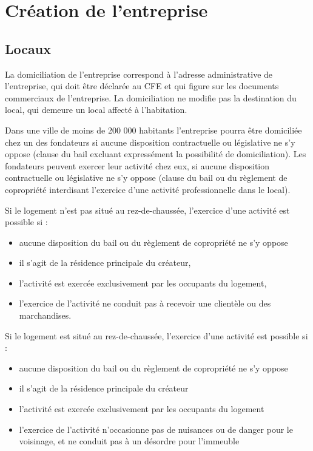 \documentclass[10pt]{article}
\begin{document}

\section{Création de l'entreprise}
\label{sec:creation_entreprise}

\subsection{Locaux}
\label{sub:locaux}

La domiciliation de l'entreprise correspond à l'adresse administrative de l'entreprise, qui doit être déclarée au CFE et qui figure sur les documents commerciaux de l'entreprise. La domiciliation ne modifie pas la destination du local, qui demeure un local affecté à l'habitation.

Dans une ville de moins de 200 000 habitants l'entreprise pourra être domiciliée chez un des fondateurs si aucune disposition contractuelle ou législative ne s'y oppose (clause du bail excluant expressément la possibilité de domiciliation). Les fondateurs peuvent exercer leur activité chez eux, si aucune disposition contractuelle ou législative ne s'y oppose (clause du bail ou du règlement de copropriété interdisant l'exercice d'une activité professionnelle dans le local).

Si le logement n'est pas situé au rez-de-chaussée, l'exercice d'une activité est possible si :
\begin{itemize}
	\item aucune disposition du bail ou du règlement de copropriété ne s'y oppose
	\item il s'agit de la résidence principale du créateur,
	\item l'activité est exercée exclusivement par les occupants du logement,
	\item l'exercice de l'activité ne conduit pas à recevoir une clientèle ou des marchandises.
\end{itemize}

Si le logement est situé au rez-de-chaussée, l'exercice d'une activité est possible  si :
\begin{itemize}
	\item aucune disposition du bail ou du règlement de copropriété ne s'y oppose
	\item il s'agit de la résidence principale du créateur
	\item l'activité est exercée exclusivement par les occupants du logement
	\item l'exercice de l'activité n'occasionne pas de nuisances ou de danger pour le voisinage, et ne conduit pas à un désordre pour l'immeuble \\
\end{itemize}
\end{document}
